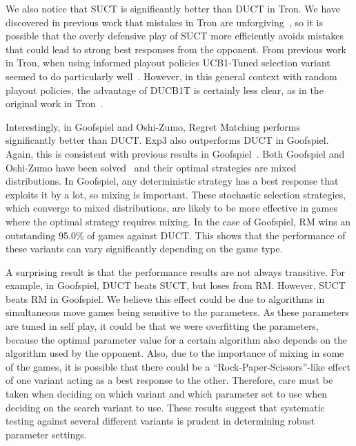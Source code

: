 \documentclass[conference]{IEEEtran}
\begin{document}
We also notice that SUCT is significantly better than DUCT in Tron. We have discovered in previous work that mistakes in
Tron are unforgiving~\cite{Lanctot13Tron}, 
so it is possible that the overly defensive play of SUCT more efficiently avoids mistakes that could lead to strong best responses from the opponent.
From previous work in Tron, when using informed playout policies UCB1-Tuned selection variant seemed to do particularly 
well~\cite{Perick12Comparison,Lanctot13Tron}. However, in this general context with random playout policies, the advantage of DUCB1T is certainly 
less clear, as in the original work in Tron~\cite{Samothrakis10Tron}.


Interestingly, in Goofspiel and Oshi-Zumo, Regret Matching performs significantly better than DUCT. Exp3 also outperforms DUCT in Goofspiel. 
Again, this is consistent with previous results in Goofspiel~\cite{Lanctot13Goofspiel}. Both Goofspiel and Oshi-Zumo have been 
solved~\cite{Buro03OshiZumo,Rhoads12Computer} and their optimal strategies are mixed distributions. In Goofspiel, any deterministic strategy 
has a best response that exploits it by a lot, so mixing is important. These stochastic selection strategies, 
which converge to mixed distributions, are likely to be more effective in games where the optimal strategy requires mixing. 
In the case of Goofspiel, RM wins an outstanding 95.0\% of games against DUCT. This shows that the performance of these variants can vary 
significantly depending on the game type. 

A surprising result is that the performance results are not always transitive. For example, in Goofspiel, DUCT beats SUCT, but loses from RM. 
However, SUCT beats RM in Goofspiel. We believe this effect could be due to algorithms in simultaneous move games being
sensitive to the parameters. As these parameters are tuned in self play, it could be that we were overfitting the parameters, because 
the optimal parameter value for a certain algorithm also depends on the algorithm used by the opponent. Also, due to the importance of mixing 
in some of the games, it is possible that there could be a ``Rock-Paper-Scissors''-like effect of one variant acting as a best response to 
the other. Therefore, care must be taken when deciding on which variant and which parameter set to use when deciding on the search variant to 
use. These results suggest that systematic testing against several different variants is prudent in determining robust parameter settings. 
\end{document}
